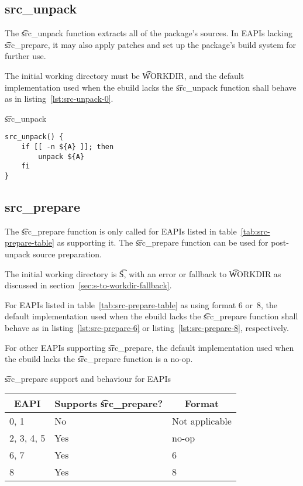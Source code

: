 \subsection{src_unpack}

The \t{src_unpack} function extracts all of the package's sources. In EAPIs lacking
\t{src_prepare}, it may also apply patches and set up the package's build system for further use.

The initial working directory must be \t{WORKDIR}, and the default implementation used when
the ebuild lacks the \t{src_unpack} function shall behave as in listing~\ref{lst:src-unpack-0}.

\begin{listing}[H]
\caption{\t{src_unpack}} \label{lst:src-unpack-0}
\begin{verbatim}
src_unpack() {
    if [[ -n ${A} ]]; then
        unpack ${A}
    fi
}
\end{verbatim}
\end{listing}

\subsection{src_prepare}

 The \t{src_prepare} function is only called for EAPIs listed in
table~\ref{tab:src-prepare-table} as supporting it. The \t{src_prepare} function can be used for
post-unpack source preparation.

The initial working directory is \t{S}, with an error or fallback to \t{WORKDIR} as discussed in
section~\ref{sec:s-to-workdir-fallback}.

For EAPIs listed in table~\ref{tab:src-prepare-table} as using format 6 or~8, the default
implementation used when the ebuild lacks the \t{src_prepare} function shall behave as in
listing~\ref{lst:src-prepare-6} or listing~\ref{lst:src-prepare-8}, respectively.

For other EAPIs supporting \t{src_prepare}, the default implementation used when the ebuild lacks
the \t{src_prepare} function is a no-op.

\begin{centertable}{\t{src_prepare} support and behaviour for EAPIs}
    \label{tab:src-prepare-table}
    \begin{tabular}{lll}
      \toprule
      \multicolumn{1}{c}{\textbf{EAPI}} &
      \multicolumn{1}{c}{\textbf{Supports \t{src_prepare}?}} &
      \multicolumn{1}{c}{\textbf{Format}} \\
      \midrule
      0, 1              & No  & Not applicable \\
      2, 3, 4, 5        & Yes & no-op          \\
      6, 7              & Yes & 6              \\
      8                 & Yes & 8              \\
      \bottomrule
    \end{tabular}
\end{centertable}

